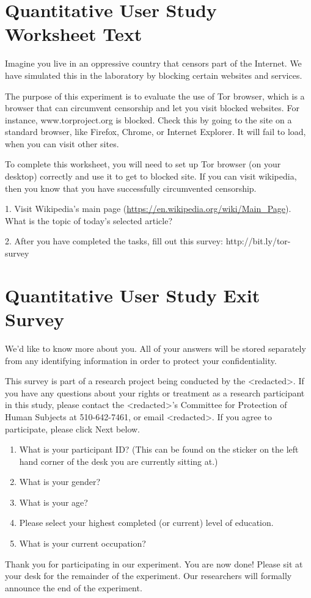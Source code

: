 \documentclass[USenglish,oneside,twocolumn]{article}
\begin{document}
\section{Quantitative User Study Worksheet Text} 
\label{summative-worksheet}
Imagine you live in an oppressive country that censors part of the Internet. We have simulated this in the laboratory by blocking certain websites and services.

The purpose of this experiment is to evaluate the use of Tor browser, which is a browser that can circumvent censorship and let you visit blocked websites. For instance, www.torproject.org is blocked. Check this by going to the site on a standard browser, like Firefox, Chrome, or Internet Explorer. It will fail to load, when you can visit other sites.

To complete this worksheet, you will need to set up Tor browser (on your desktop) correctly and use it to get to blocked site. If you can visit wikipedia, then you know that you have successfully circumvented censorship.

1. Visit Wikipedia’s main page (\url{https://en.wikipedia.org/wiki/Main\_Page}). What is the topic of today’s selected article? 

2. After you have completed the tasks, fill out this survey: http://bit.ly/tor-survey 


\section{Quantitative User Study Exit Survey} 
\label{quantitative-exit-survey}
We'd like to know more about you.  All of your answers will be stored separately from any identifying information in order to protect your confidentiality.

This survey is part of a research project being conducted by the <redacted>. %
If you have any questions about your rights or treatment as a research participant in this study, please contact the <redacted>'s %
Committee for Protection of Human Subjects at 510-642-7461, or email 
<redacted>. %
If you agree to participate, please click Next below.\\

\begin{enumerate}
\item{What is your participant ID? (This can be found on the sticker on the left hand corner of the desk you are currently sitting at.)}
\item{What is your gender?}
\item{What is your age?}
\item{Please select your highest completed (or current) level of education}.
\item{What is your current occupation?}  
\end{enumerate}

Thank you for participating in our experiment. You are now done! Please sit at your desk for the remainder of the experiment. Our researchers will formally announce the end of the experiment. 
\end{document}
